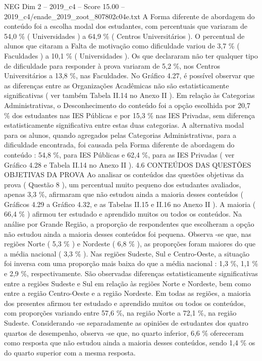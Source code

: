 \begin{textsample}{NEG Dim 2 – 2019\_c4 – Score 15.00 – 2019\_c4/enade\_2019\_zoot\_807802c04e.txt}
A Forma diferente de abordagem do conteúdo foi a escolha modal dos estudantes, com percentuais que variaram de 54,0 \% ( Universidades ) a 64,9 \% ( Centros Universitários ).
O percentual de alunos que citaram a Falta de motivação como dificuldade variou de 3,7 \% ( Faculdades ) a 10,1 \% ( Universidades ).
Os que declararam não ter qualquer tipo de dificuldade para responder à prova variaram de 5,2 \%, nos Centros Universitários a 13,8 \%, nas Faculdades.
No Gráfico 4.27, é possível observar que as diferenças entre as Organizações Acadêmicas não são estatisticamente significativas ( ver também Tabela II.14 no Anexo II ).
Em relação às Categorias Administrativas, o Desconhecimento do conteúdo foi a opção escolhida por 20,7 \% dos estudantes nas IES Públicas e por 15,3 \% nas IES Privadas, sem diferença estatisticamente significativa entre estas duas categorias.
A alternativa modal para os alunos, quando agregados pelas Categorias Administrativas, para a dificuldade encontrada, foi causada pela Forma diferente de abordagem do conteúdo : 54,8 \%, para IES Públicas e 62,4 \%, para as IES Privadas ( ver Gráfico 4.28 e Tabela II.14 no Anexo II ). 4.6 CONTEÚDOS DAS QUESTÕES OBJETIVAS DA PROVA Ao analisar os conteúdos das questões objetivas da prova ( Questão 8 ), um percentual muito pequeno dos estudantes avaliados, apenas 3,3 \%, afirmaram que não estudou ainda a maioria desses conteúdos ( Gráficos 4.29 a Gráfico 4.32, e as Tabelas II.15 e II.16 no Anexo II ).
A maioria ( 66,4 \% ) afirmou ter estudado e aprendido muitos ou todos os conteúdos.
Na análise por Grande Região, a proporção de respondentes que escolheram a opção não estudou ainda a maioria desses conteúdos foi pequena.
Observa -se que, nas regiões Norte ( 5,3 \% ) e Nordeste ( 6,8 \% ), as proporções foram maiores do que a média nacional ( 3,3 \% ).
Nas regiões Sudeste, Sul e Centro-Oeste, a situação foi inversa com uma proporção mais baixa do que a média nacional : 1,3 \%, 1,1 \% e 2,9 \%, respectivamente.
São observadas diferenças estatisticamente significativas entre a regiões Sudeste e Sul em relação às regiões Norte e Nordeste, bem como entre a região Centro-Oeste e a região Nordeste.
Em todas as regiões, a maioria dos presentes afirmou ter estudado e aprendido muitos ou todos os conteúdos, com proporções variando entre 57,6 \%, na região Norte a 72,1 \%, na região Sudeste.
Considerando -se separadamente as opiniões de estudantes dos quatro quartos de desempenho, observa -se que, no quarto inferior, 6,6 \% ofereceram como resposta que não estudou ainda a maioria desses conteúdos, sendo 1,4 \% os do quarto superior com a mesma resposta.

\end{textsample}
